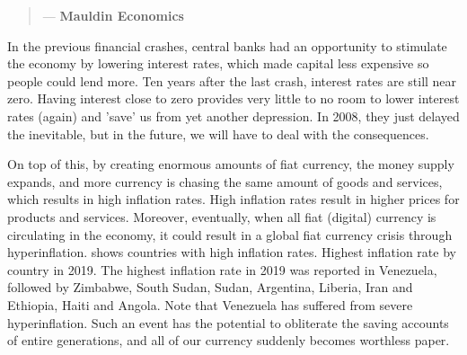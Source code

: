 \begin{quotation}

      \textit{}
      \begin{flushright}
        \small{--- \textbf{Mauldin Economics}}
      \end{flushright}
    
\end{quotation}


In the previous financial crashes, central banks had an opportunity to stimulate the economy by lowering interest rates, which made capital less expensive so people could lend more. Ten years after the last crash, interest rates are still near zero. Having interest close to zero provides very little to no room to lower interest rates (again) and 'save' us from yet another depression. In 2008, they just delayed the inevitable, but in the future, we will have to deal with the consequences.\medskip

On top of this, by creating enormous amounts of fiat currency, the money supply expands, and more currency is chasing the same amount of goods and services, which results in high inflation rates. High inflation rates result in higher prices for products and services. Moreover, eventually, when all fiat (digital) currency is circulating in the economy, it could result in a global fiat currency crisis through hyperinflation.  shows countries with high inflation rates. Highest inflation rate by country in 2019. The highest inflation rate in 2019 was reported in Venezuela, followed by Zimbabwe, South Sudan, Sudan, Argentina, Liberia, Iran and Ethiopia, Haiti and Angola. Note that Venezuela has suffered from severe hyperinflation. Such an event has the potential to obliterate the saving accounts of entire generations, and all of our currency suddenly becomes worthless paper. 

